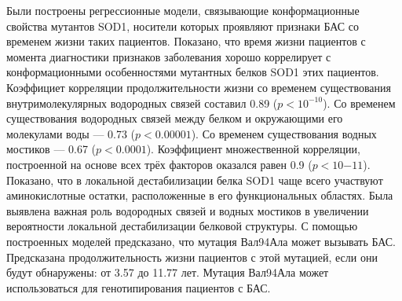 Были построены регрессионные модели, связывающие конформационные свойства мутантов SOD1, носители которых проявляют признаки БАС со временем жизни таких пациентов. Показано, что время жизни пациентов с момента диагностики признаков заболевания хорошо коррелирует с конформационными особенностями мутантных белков SOD1 этих пациентов. Коэффициет корреляции продолжительности жизни со временем существования внутримолекулярных водородных связей составил 0.89 ($p<10^{-10}$). Со временем существования водородных связей между белком и окружающими его молекулами воды — 0.73 ($p<0.00001$). Со временем существования водных мостиков — 0.67 ($p<0.0001$). Коэффициент множественной корреляции, построенной на основе всех трёх факторов оказался равен 0.9 ($p<10{-11}$). Показано, что в локальной дестабилизации белка SOD1 чаще всего участвуют аминокислотные остатки, расположенные в его функциональных областях. Была выявлена важная роль водородных связей и водных мостиков в увеличении вероятности локальной дестабилизации белковой структуры. С помощью построенных моделей предсказано, что мутация Вал94Ала может вызывать БАС. Предсказана продолжительность жизни пациентов с этой мутацией, если они будут обнаружены: от 3.57 до 11.77 лет. Мутация Вал94Ала может использоваться для генотипирования пациентов с БАС.

